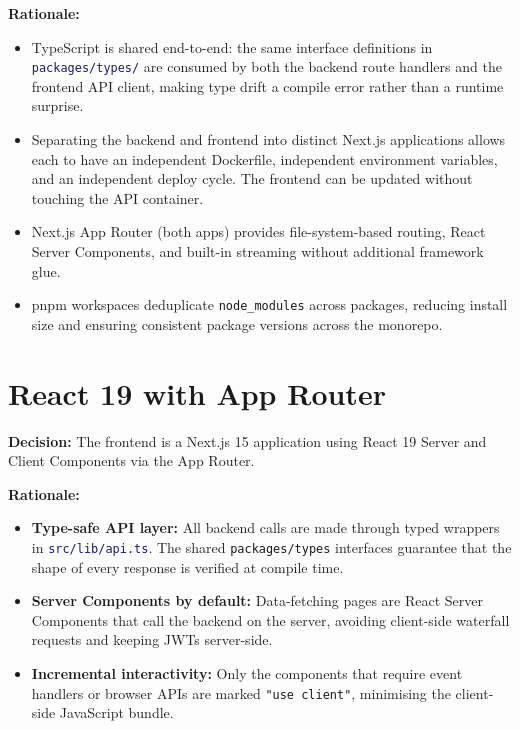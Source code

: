 \documentclass[12pt,a4paper,twoside]{report}
\newcommand{\code}[1]{\texttt{#1}}
\newcommand{\file}[1]{\texttt{\textcolor{MidnightBlue}{#1}}}
\begin{document}
\textbf{Rationale:}
\begin{itemize}
  \item TypeScript is shared end-to-end: the same interface definitions
        in \file{packages/types/} are consumed by both the backend route
        handlers and the frontend API client, making type drift a
        compile error rather than a runtime surprise.
  \item Separating the backend and frontend into distinct Next.js
        applications allows each to have an independent Dockerfile,
        independent environment variables, and an independent deploy
        cycle. The frontend can be updated without touching the API
        container.
  \item Next.js App Router (both apps) provides file-system-based
        routing, React Server Components, and built-in streaming without
        additional framework glue.
  \item pnpm workspaces deduplicate \code{node\_modules} across
        packages, reducing install size and ensuring consistent package
        versions across the monorepo.
\end{itemize}

\section{React 19 with App Router}

\textbf{Decision:} The frontend is a Next.js 15 application using
React 19 Server and Client Components via the App Router.

\textbf{Rationale:}
\begin{itemize}
  \item \textbf{Type-safe API layer:} All backend calls are made through
        typed wrappers in \file{src/lib/api.ts}. The shared
        \code{packages/types} interfaces guarantee that the shape of
        every response is verified at compile time.
  \item \textbf{Server Components by default:} Data-fetching pages are
        React Server Components that call the backend on the server,
        avoiding client-side waterfall requests and keeping JWTs
        server-side.
  \item \textbf{Incremental interactivity:} Only the components that
        require event handlers or browser APIs are marked
        \code{"use client"}, minimising the client-side JavaScript
        bundle.
\end{itemize}
\end{document}
